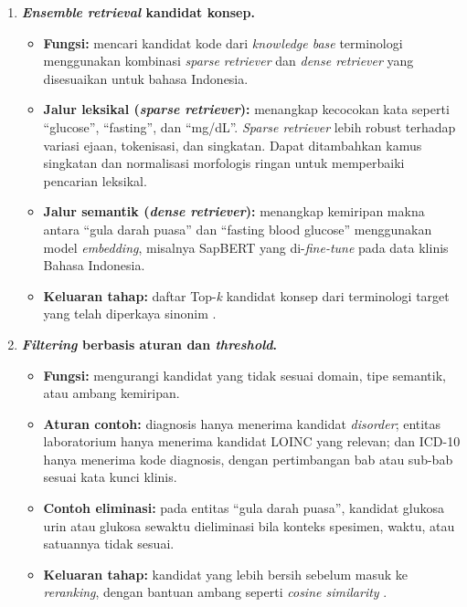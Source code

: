 \begin{enumerate}
    \item \textbf{\textit{Ensemble retrieval} kandidat konsep.}
    \begin{itemize}
        \item \textbf{Fungsi:} mencari kandidat kode dari \textit{knowledge base} terminologi menggunakan kombinasi \textit{sparse retriever} dan \textit{dense retriever} yang disesuaikan untuk bahasa Indonesia.
        \item \textbf{Jalur leksikal (\textit{sparse retriever}):} menangkap kecocokan kata seperti ``glucose'', ``fasting'', dan ``mg/dL''. \textit{Sparse retriever} lebih robust terhadap variasi ejaan, tokenisasi, dan singkatan. Dapat ditambahkan kamus singkatan dan normalisasi morfologis ringan untuk memperbaiki pencarian leksikal.
        \item \textbf{Jalur semantik (\textit{dense retriever}):} menangkap kemiripan makna antara ``gula darah puasa'' dan ``fasting blood glucose'' menggunakan model \textit{embedding}, misalnya SapBERT yang di-\textit{fine-tune} pada data klinis Bahasa Indonesia.
        \item \textbf{Keluaran tahap:} daftar Top-\textit{k} kandidat konsep dari terminologi target yang telah diperkaya sinonim \citep{gilani_cde-mapper_2025}.
    \end{itemize}

    \item \textbf{\textit{Filtering} berbasis aturan dan \textit{threshold}.}
    \begin{itemize}
        \item \textbf{Fungsi:} mengurangi kandidat yang tidak sesuai domain, tipe semantik, atau ambang kemiripan.
        \item \textbf{Aturan contoh:} diagnosis hanya menerima kandidat \textit{disorder}; entitas laboratorium hanya menerima kandidat LOINC yang relevan; dan ICD-10 hanya menerima kode diagnosis, dengan pertimbangan bab atau sub-bab sesuai kata kunci klinis.
        \item \textbf{Contoh eliminasi:} pada entitas ``gula darah puasa'', kandidat glukosa urin atau glukosa sewaktu dieliminasi bila konteks spesimen, waktu, atau satuannya tidak sesuai.
        \item \textbf{Keluaran tahap:} kandidat yang lebih bersih sebelum masuk ke \textit{reranking}, dengan bantuan ambang seperti \textit{cosine similarity} \citep{chen_clinical_2020}.
    \end{itemize}


\end{enumerate}

